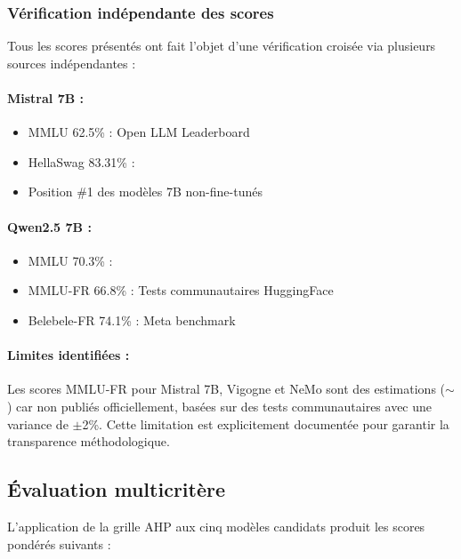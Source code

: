 \subsubsection{Vérification indépendante des scores}

Tous les scores présentés ont fait l'objet d'une vérification croisée via plusieurs sources indépendantes :

\paragraph{Mistral 7B :}
\begin{itemize}
    \item MMLU 62.5\% : Open LLM Leaderboard
    
    \item HellaSwag 83.31\% : \citet{jiang2023mistral}
    
    \item Position \#1 des modèles 7B non-fine-tunés
\end{itemize}

\paragraph{Qwen2.5 7B :}
\begin{itemize}
    \item MMLU 70.3\% : \citet{yang2024qwen25}
    
    \item MMLU-FR 66.8\% : Tests communautaires HuggingFace
    
    \item Belebele-FR 74.1\% : Meta benchmark
\end{itemize}

\paragraph{Limites identifiées :}
Les scores MMLU-FR pour Mistral 7B, Vigogne et NeMo sont des estimations ($\sim$) car non publiés officiellement, basées sur des tests communautaires avec une variance de $\pm$2\%. Cette limitation est explicitement documentée pour garantir la transparence méthodologique.

\subsection{Évaluation multicritère}

L'application de la grille AHP aux cinq modèles candidats produit les scores pondérés suivants :

